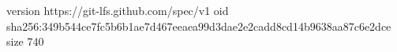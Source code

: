 version https://git-lfs.github.com/spec/v1
oid sha256:349b544ce7fc5b6b1ae7d467eeaea99d3dae2e2cadd8cd14b9638aa87c6e2dce
size 740
